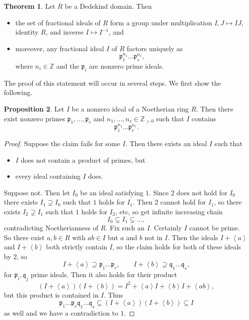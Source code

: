 \documentclass{article}
\newcommand{\Z}{\mathbb{Z}}
\newcommand{\rb}[1]{\left( #1 \right)}
\newcommand{\ab}[1]{\left\langle #1 \right\rangle}
\theoremstyle{definition}\newtheorem{definition}{Definition}[subsection]
\theoremstyle{definition}\newtheorem{remark}[definition]{Remark}
\theoremstyle{definition}\newtheorem*{example}{Example}
\theoremstyle{definition}\newtheorem*{note}{Note}
\newtheorem{proposition}[definition]{Proposition}
\newtheorem{theorem}[definition]{Theorem}
\begin{document}
\begin{theorem}
Let $ R $ be a Dedekind domain. Then
\begin{itemize}
\item the set of fractional ideals of $ R $ form a group under multiplication $ I, J \mapsto IJ $, identity $ R $, and inverse $ I \mapsto I^{-1} $, and
\item moreover, any fractional ideal $ I $ of $ R $ factors uniquely as
$$ \mathfrak{p}_1^{n_1} \dots \mathfrak{p}_s^{n_s}, $$
where $ n_i \in \Z $ and the $ \mathfrak{p}_i $ are nonzero prime ideals.
\end{itemize}
\end{theorem}


The proof of this statement will occur in several steps. We first show the following.

\begin{proposition}
Let $ I $ be a nonzero ideal of a Noetherian ring $ R $. Then there exist nonzero primes $ \mathfrak{p}_1, \dots, \mathfrak{p}_r $ and $ n_1, \dots, n_r \in \Z_{> 0} $ such that $ I $ contains
$$ \mathfrak{p}_1^{n_1} \dots \mathfrak{p}_r^{n_r}. $$
\end{proposition}

\begin{proof}
Suppose the claim fails for some $ I $. Then there exists an ideal $ I $ such that
\begin{itemize}
\item $ I $ does not contain a product of primes, but
\item every ideal containing $ I $ does.
\end{itemize}
Suppose not. Then let $ I_0 $ be an ideal satisfying $ 1 $. Since $ 2 $ does not hold for $ I_0 $ there exists $ I_1 \supsetneq I_0 $ such that $ 1 $ holds for $ I_1 $. Then $ 2 $ cannot hold for $ I_1 $, so there exists $ I_2 \supsetneq I_1 $ such that $ 1 $ holds for $ I_2 $, etc, so get infinite increasing chain
$$ I_0 \subsetneq I_1 \subsetneq \dots, $$
contradicting Noetherianness of $ R $. Fix such an $ I $. Certainly $ I $ cannot be prime. So there exist $ a, b \in R $ with $ ab \in I $ but $ a $ and $ b $ not in $ I $. Then the ideals $ I + \ab{a} $ and $ I + \ab{b} $ both strictly contain $ I $, so the claim holds for both of these ideals by $ 2 $, so
$$ I + \ab{a} \supseteq \mathfrak{p}_1 \dots \mathfrak{p}_r, \qquad I + \ab{b} \supseteq \mathfrak{q}_1 \dots \mathfrak{q}_s, $$
for $ \mathfrak{p}_i, \mathfrak{q}_j $ prime ideals. Then it also holds for their product
$$ \rb{I + \ab{a}}\rb{I + \ab{b}} = I^2 + \ab{a}I + \ab{b}I + \ab{ab}, $$
but this product is contained in $ I $. Thus
$$ \mathfrak{p}_1 \dots \mathfrak{p}_r\mathfrak{q}_1 \dots \mathfrak{q}_s \subseteq \rb{I + \ab{a}}\rb{I + \ab{b}} \subseteq I $$
as well and we have a contradiction to $ 1 $.
\end{proof}
\end{document}
